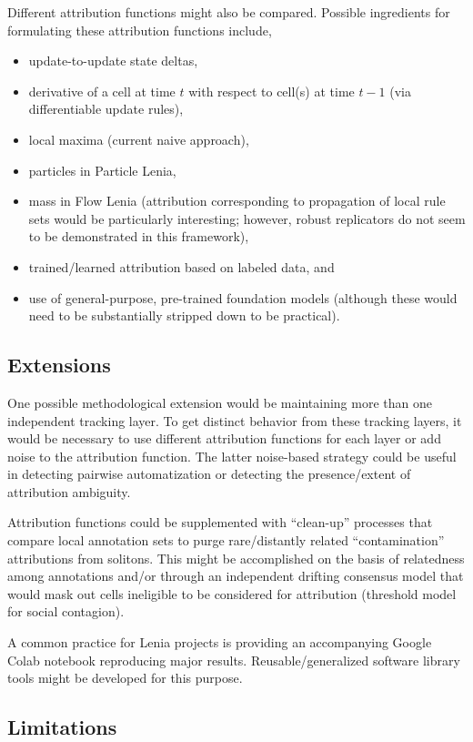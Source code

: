 Different attribution functions might also be compared.
Possible ingredients for formulating these attribution functions include,
\begin{itemize}
\item update-to-update state deltas,
\item derivative of a cell at time $t$ with respect to cell(s) at time $t-1$ (via differentiable update rules),
\item local maxima (current naive approach),
\item particles in Particle Lenia,
\item mass in Flow Lenia (attribution corresponding to propagation of local rule sets would be particularly interesting; however, robust replicators do not seem to be demonstrated in this framework),
\item trained/learned attribution based on labeled data, and
\item use of general-purpose, pre-trained foundation models (although these would need to be substantially stripped down to be practical).
\end{itemize}

\subsection{Extensions}

One possible methodological extension would be maintaining more than one independent tracking layer.
To get distinct behavior from these tracking layers, it would be necessary to use different attribution functions for each layer or add noise to the attribution function.
The latter noise-based strategy could be useful in detecting pairwise automatization or detecting the presence/extent of attribution ambiguity.

Attribution functions could be supplemented with ``clean-up'' processes that compare local annotation sets to purge rare/distantly related ``contamination'' attributions from solitons.
This might be accomplished on the basis of relatedness among annotations and/or through an independent drifting consensus model that would mask out cells ineligible to be considered for attribution (threshold model for social contagion).

A common practice for Lenia projects is providing an accompanying Google Colab notebook reproducing major results.
Reusable/generalized software library tools might be developed for this purpose.

\subsection{Limitations}

